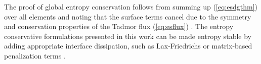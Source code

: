 \documentclass{svjour3}                     %
\renewcommand{\hat}{\widehat}
\newcommand{\diag}[1]{{\rm diag}\LRp{#1}}
\newcommand{\pd}[2]{\frac{\partial#1}{\partial#2}}
\newcommand{\LRp}[1]{\left( #1 \right)}
\newcommand{\LRs}[1]{\left[ #1 \right]}
\begin{document}

The proof of global entropy conservation follows from summing up (\ref{eq:esdgthm}) over all elements and noting that the surface terms cancel due to the symmetry and conservation properties of the Tadmor flux (\ref{eq:esflux}) \cite{chan2017discretely}.  The entropy conservative formulations presented in this work can be made entropy stable by adding appropriate interface dissipation, such as Lax-Friedrichs or matrix-based penalization terms \cite{winters2017uniquely, chen2017entropy, chan2017discretely}.  
\end{document}
